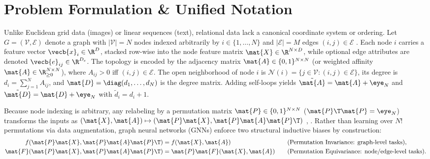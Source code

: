 \documentclass[../../../../master.tex]{subfiles}
\begin{document}

\section{Problem Formulation \& Unified Notation}
\label{sec:gnn:formulation}

Unlike Euclidean grid data (images) or linear sequences (text), relational data lack a canonical coordinate system or ordering. Let $G = (\mathcal{V}, \mathcal{E})$ denote a graph with $|\mathcal{V}| = N$ nodes indexed arbitrarily by $i \in \{1,\dots,N\}$ and $|\mathcal{E}| = M$ edges $(i,j) \in \mathcal{E}$ . Each node $i$ carries a feature vector $\vecb{x}_i \in \R^D$, stacked row-wise into the node feature matrix $\mat{X} \in \R^{N \times D}$, while optional edge attributes are denoted $\vecb{e}_{ij} \in \R^{D_e}$. The topology is encoded by the adjacency matrix $\mat{A} \in \{0,1\}^{N \times N}$ (or weighted affinity $\mat{A} \in \R_{\ge 0}^{N \times N}$), where $A_{ij} > 0$ iff $(i,j) \in \mathcal{E}$. The open neighborhood of node $i$ is $\mathcal{N}(i) = \{j \in \mathcal{V} : (i,j) \in \mathcal{E}\}$, its degree is $d_i = \sum_{j=1}^N A_{ij}$, and $\mat{D} = \diag(d_1,\dots,d_N)$ is the degree matrix. Adding self-loops yields $\tilde{\mat{A}} = \mat{A} + \eye_N$ and $\tilde{\mat{D}} = \mat{D} + \eye_N$ with $\tilde{d}_i = d_i + 1$.

Because node indexing is arbitrary, any relabeling by a permutation matrix $\mat{P} \in \{0,1\}^{N \times N}$ ($\mat{P}\T\mat{P} = \eye_N$) transforms the inputs as $(\mat{X}, \mat{A}) \mapsto (\mat{P}\mat{X}, \mat{P}\mat{A}\mat{P}\T)$ , . Rather than learning over $N!$ permutations via data augmentation, graph neural networks (GNNs) enforce two structural inductive biases by construction:
\begin{align}
  f(\mat{P}\mat{X}, \mat{P}\mat{A}\mat{P}\T) &= f(\mat{X}, \mat{A}) \quad &&\text{(Permutation Invariance: graph-level tasks)}, \label{eq:gnn:invariance}\\
  \mat{F}(\mat{P}\mat{X}, \mat{P}\mat{A}\mat{P}\T) &= \mat{P}\mat{F}(\mat{X}, \mat{A}) \quad &&\text{(Permutation Equivariance: node/edge-level tasks)}. \label{eq:gnn:equivariance}
\end{align}
\end{document}
